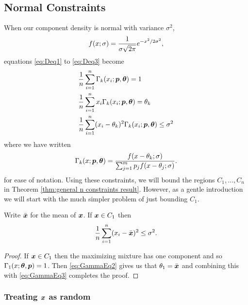 	\subsection{Normal Constraints}
		When our component density is normal with variance $\sigma^2$,
		\begin{equation}
			f(x;\sigma) = \frac{1}{\sigma \sqrt{2\pi}} e^{-x^2/2\sigma^2},
		\end{equation}
		equations \eqref{eq:Deq1} to \eqref{eq:Deq3} become
		\begin{align}
			&\frac{1}{n} \sum_{i=1}^n \Gamma_k(x_i;{\bm{{p}}},{\bm{{\theta}}}) = 1 \label{eq:GammaEq1}\\
			&\frac{1}{n} \sum_{i=1}^n x_i \Gamma_k(x_i;{\bm{{p}}},{\bm{{\theta}}}) = \theta_k \label{eq:GammaEq2}\\
			&\frac{1}{n} \sum_{i=1}^n (x_i - \theta_k)^2 \Gamma_k(x_i;{\bm{{p}}},{\bm{{\theta}}}) \leq \sigma^2
			\label{eq:GammaEq3}
		\end{align}
		where we have written
		\begin{equation}
			\Gamma_k(x;{\bm{{p}}},{\bm{{\theta}}}) = \frac{f(x - \theta_k;\sigma)}{\sum_{j=1}^m p_j f(x - \theta_j;\sigma)}.
		\end{equation}
		for ease of notation. Using these constraints, we will bound the regions
		$C_1, \dots, C_n$ in Theorem \ref{thm:general n constraints result}. However, as a gentle introduction we will start with the much simpler problem of just bounding $C_1$.

		\begin{theorem}
			\label{thm:general n C1 bound}
			Write $\bar{{\bm{{x}}}}$ for the mean of ${\bm{{x}}}$. If ${\bm{{x}}} \in C_1$ then 
			\begin{equation}
				\frac{1}{n} \sum_{i=1}^n (x_i - \bar{{\bm{{x}}}})^2 \leq \sigma^2.
			\end{equation}
		\end{theorem}
		\begin{proof}
			If ${\bm{{x}}} \in C_1$ then the maximizing mixture has one component and so $\Gamma_1(x; {\bm{{\theta}}}, {\bm{{p}}}) = 1$. Then \eqref{eq:GammaEq2} gives us that $\theta_1 = \bar{{\bm{{x}}}}$ and combining this with \eqref{eq:GammaEq3} completes the proof.
		\end{proof}

	\subsubsection{Treating \texorpdfstring{${\bm{{x}}}$}{x} as random}


